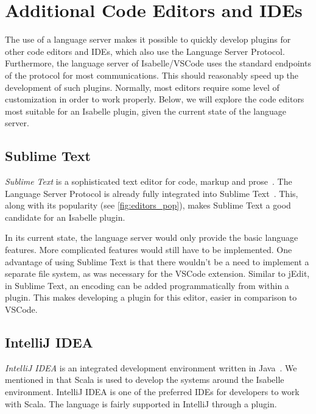 

\section{Additional Code Editors and IDEs}
The use of a language server makes it possible to quickly develop plugins for other code editors and IDEs, which also use the Language Server Protocol. Furthermore, the language server of Isabelle/VSCode uses the standard endpoints of the protocol for most communications. This should reasonably speed up the development of such plugins.   Normally, most editors require some level of customization in order to work properly. Below, we will explore the code editors most suitable for an Isabelle plugin, given the current state of the language server.

\subsection{Sublime Text}
\emph{Sublime Text} is a sophisticated text editor for code, markup and prose~\parencite{sublime}. The Language Server Protocol is already fully integrated into Sublime Text~\parencite{lsp_sublime}. This, along with its popularity (see \autoref{fig:editors_pop}), makes Sublime Text a good candidate for an Isabelle plugin.

In its current state, the language server would only provide the basic language features. More complicated features would still have to be implemented. One advantage of using Sublime Text is that there wouldn't be a need to implement a separate file system, as was necessary for the VSCode extension. Similar to jEdit, in Sublime Text, an encoding can be added programmatically from within a plugin. This makes developing a plugin for this editor, easier in comparison to VSCode.

\subsection{IntelliJ IDEA}
\emph{IntelliJ IDEA} is an integrated development environment written in Java~\parencite{intellij}. We mentioned in  that Scala is used to develop the systems around the Isabelle environment. IntelliJ IDEA is one of the preferred IDEs for developers to work with Scala. The language is fairly supported in IntelliJ through a plugin. 

